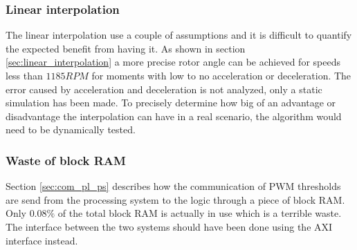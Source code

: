 \subsubsection{Linear interpolation}

The linear interpolation use a couple of assumptions and it is difficult to quantify the expected benefit from having it. As shown in section \ref{sec:linear_interpolation} a more precise rotor angle can be achieved for speeds less than $1185RPM$ for moments with low to no acceleration or deceleration. The error caused by acceleration and deceleration is not analyzed, only a static simulation has been made. To precisely determine how big of an advantage or disadvantage the interpolation can have in a real scenario, the algorithm would need to be dynamically tested.

\subsubsection{Waste of block RAM}
Section \ref{sec:com_pl_ps} describes how the communication of PWM thresholds are send from the processing system to the logic through a piece of block RAM. Only $0.08\%$ of the total block RAM is actually in use which is a terrible waste. The interface between the two systems should have been done using the AXI interface instead.


 
 